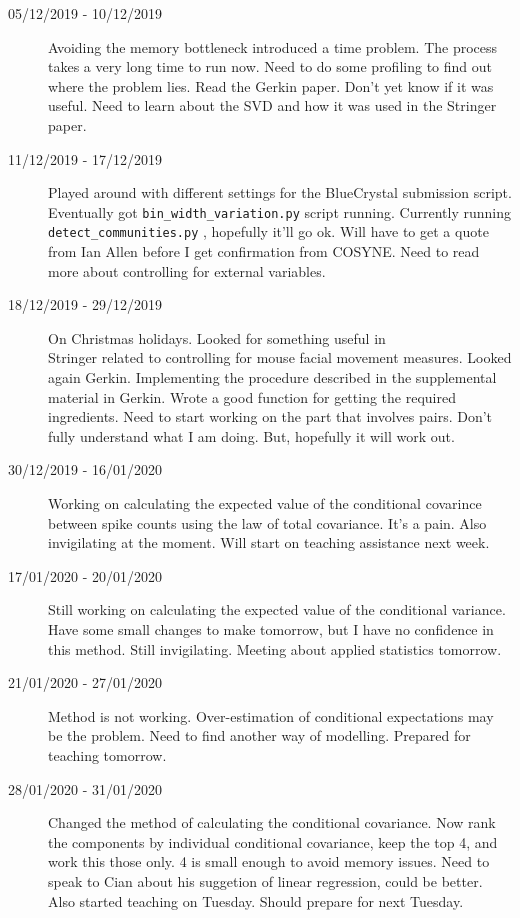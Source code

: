 \documentclass[a4paper,12pt]{article}
\theoremstyle{definition}
\begin{document}
\begin{description}
	\item[05/12/2019 - 10/12/2019] Avoiding the memory bottleneck introduced a time problem. The process takes a very long time to run now. Need to do some profiling to find out where the problem lies. Read the Gerkin paper. Don't yet know if it was useful. Need to learn about the SVD and how it was used in the Stringer paper.

	\item[11/12/2019 - 17/12/2019] Played around with different settings for the BlueCrystal submission script. Eventually got \texttt{bin\_width\_variation.py} script running. Currently running \texttt{detect\_communities.py} , hopefully it'll go ok. Will have to get a quote from Ian Allen before I get confirmation from COSYNE. Need to read more about controlling for external variables.

	\item[18/12/2019 - 29/12/2019] On Christmas holidays. Looked for something useful in \\ Stringer related to controlling for mouse facial movement measures. Looked again Gerkin. Implementing the procedure described in the supplemental material in Gerkin. Wrote a good function for getting the required ingredients. Need to start working on the part that involves pairs. Don't fully understand what I am doing. But, hopefully it will work out.

	\item[30/12/2019 - 16/01/2020] Working on calculating the expected value of the conditional covarince between spike counts using the law of total covariance. It's a pain. Also invigilating at the moment. Will start on teaching assistance next week.

	\item[17/01/2020 - 20/01/2020] Still working on calculating the expected value of the conditional variance. Have some small changes to make tomorrow, but I have no confidence in this method. Still invigilating. Meeting about applied statistics tomorrow.

	\item[21/01/2020 - 27/01/2020] Method is not working. Over-estimation of conditional expectations may be the problem. Need to find another way of modelling. Prepared for teaching tomorrow.

	\item[28/01/2020 - 31/01/2020] Changed the method of calculating the conditional covariance. Now rank the components by individual conditional covariance, keep the top 4, and work this those only. 4 is small enough to avoid memory issues. Need to speak to Cian about his suggetion of linear regression, could be better. Also started teaching on Tuesday. Should prepare for next Tuesday.


\end{description}
\end{document}

